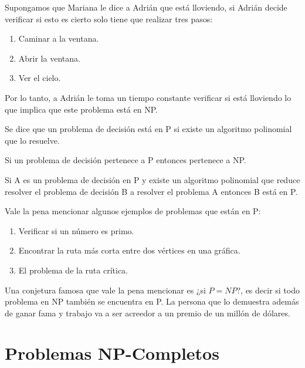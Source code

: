 \begin{eje}
Supongamos que Mariana le dice a Adrián que está lloviendo, si Adrián decide verificar si esto es cierto solo tiene que realizar tres pasos:
\begin{enumerate}
\item Caminar a la ventana.
\item Abrir la ventana.
\item Ver el cielo.
\end{enumerate}
Por lo tanto, a Adrián le toma un tiempo constante verificar si está lloviendo lo que implica que este problema está en NP.
 \fin
\end{eje}
\begin{dfn}
Se dice que un problema de decisión está en P si existe un algoritmo polinomial que lo resuelve.
\end{dfn}
\begin{obs}[$P \subseteq NP$]
Si un problema de decisión pertenece a P entonces pertenece a NP.
\end{obs}
\begin{obs}
\label{pp eq}
Si A es un problema de decisión en P y existe un algoritmo polinomial que reduce resolver el problema de decisión B a resolver el problema A entonces B está en P.
\end{obs}

Vale la pena mencionar algunos ejemplos de problemas que están en P:
\begin{enumerate}
\item Verificar si un número es primo.
\item Encontrar la ruta más corta entre dos vértices en una gráfica.
\item El problema de la ruta crítica. 
\end{enumerate}

Una conjetura famosa que vale la pena mencionar es ¿si $P=NP$?, es decir si todo problema en NP también se encuentra en P. La persona que lo demuestra además de ganar fama y trabajo va a ser acreedor a un premio de un millón de dólares. 


\section{Problemas NP-Completos}

